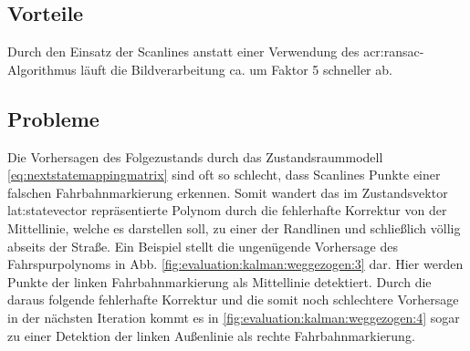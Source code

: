 \subsection{Vorteile}
\label{ssec:polynombasierte:kalman:vorteile}
Durch den Einsatz der Scanlines anstatt einer Verwendung des \gls{acr:ransac}-Algorithmus 
läuft die Bildverarbeitung ca. um Faktor 5 schneller ab.

\subsection{Probleme}
\label{ssec:polynombasierte:kalman:probleme}
Die Vorhersagen des Folgezustands durch das Zustandsraummodell \eqref{eq:nextstatemappingmatrix} sind oft so schlecht, dass Scanlines Punkte einer falschen Fahrbahnmarkierung erkennen. Somit \glqq wandert\grqq{} das im Zustandsvektor \gls{lat:statevector} repräsentierte Polynom durch die fehlerhafte Korrektur von der Mittellinie, welche es darstellen soll, zu einer der Randlinen und schließlich völlig abseits der Straße. Ein Beispiel stellt die ungenügende Vorhersage des Fahrspurpolynoms in Abb. \ref{fig:evaluation:kalman:weggezogen:3} dar. Hier werden Punkte der linken Fahrbahnmarkierung als Mittellinie detektiert. Durch die daraus folgende fehlerhafte Korrektur und die somit noch schlechtere Vorhersage in der nächsten Iteration kommt es in \ref{fig:evaluation:kalman:weggezogen:4} sogar zu einer Detektion der linken Außenlinie als rechte Fahrbahnmarkierung.

